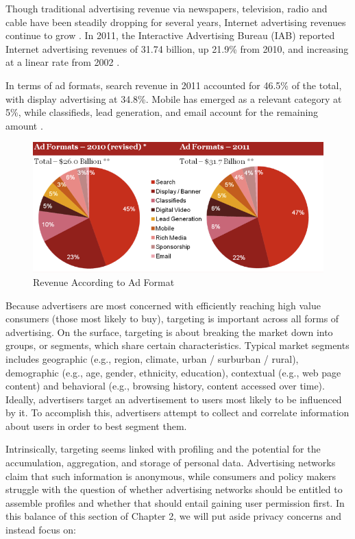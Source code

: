 Though traditional advertising revenue via newspapers, television, radio and cable have been steadily dropping for several years, Internet advertising revenues continue to grow  \citep{IAB:sv1S8BTo}.  In 2011, the Interactive Advertising Bureau (IAB) reported Internet advertising revenues of 31.74 billion, up 21.9\% from 2010, and increasing at a linear rate from 2002  \citep{IAB:sv1S8BTo}. 

In terms of ad formats, search revenue in 2011 accounted for 46.5\% of the total, with display advertising at 34.8\%. Mobile has emerged as a relevant category at 5\%, while classifieds, lead generation, and email account for the remaining amount  \citep{IAB:sv1S8BTo}. 


\begin{figure}
\centerline{
  \includegraphics{chapter2.tex/Image0}
  }
\caption{Revenue According to Ad Format \citep[Image credit: ][]{IAB:sv1S8BTo}}
\end{figure}

\begin{sloppier}
Because advertisers are most concerned with efficiently reaching high value consumers (those most likely to buy), targeting is important across all forms of advertising. On the surface, targeting is about breaking the market down into groups, or segments, which share certain characteristics. Typical market segments includes geographic (e.g., region, climate, urban / surburban / rural), demographic (e.g., age, gender, ethnicity, education), contextual (e.g., web page content) and behavioral (e.g., browsing history, content accessed over time). Ideally, advertisers target an advertisement to users most likely to be influenced by it. To accomplish this, advertisers attempt to collect and correlate information about users in order to best segment them. 
\end{sloppier}


Intrinsically, targeting seems linked with profiling and the potential for the accumulation, aggregation, and storage of personal data. Advertising networks claim that such information is anonymous, while consumers and policy makers struggle with the question of whether advertising networks should be entitled to assemble profiles and whether that should entail gaining user permission first. In this balance of this section of Chapter 2, we will put aside privacy concerns and instead focus on:

